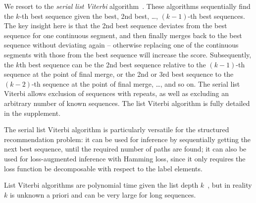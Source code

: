 We resort to the \emph{serial list Viterbi} algorithm~\cite{seshadri1994list,nilsson2001sequentially}.
These algorithms sequentially find the $k$-th best sequence given the best, 2nd best, \dots, $(k \!-\! 1)$-th best sequences.
The key insight here is that the 2nd best sequence deviates from the best sequence
for one continuous segment, and then finally merges back to the best sequence without deviating again
-- otherwise replacing one of the continuous segments with those from the best sequence will increase the score.
Subsequently, the $k$th best sequence can be the 2nd best sequence relative to the $(k \!-\! 1)$-th sequence
at the point of final merge, or the 2nd or 3rd best sequence to the $(k \!-\! 2)$-th sequence at the point of final merge, \ldots, and so on.
The serial list Viterbi allows exclusion of sequences with repeats, %
as well as
excluding an arbitrary number of known sequences. %
The list Viterbi algorithm is fully detailed in the supplement.

The serial list Viterbi algorithm is particularly versatile
for the structured recommendation problem: %
it can be used for inference by sequentially getting the next best sequence, until the required number of %
paths are found;
it can also be used for loss-augmented inference with Hamming loss,
since it only requires the loss function be decomposable with respect to the label elements.


%
List Viterbi algorithms are polynomial time given the list depth $k$~\cite{nilsson2001sequentially},
but in reality $k$ is unknown a priori and can be very large for long sequences.
